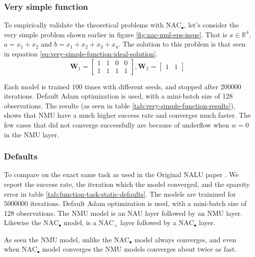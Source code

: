 \subsubsection{Very simple function}

To empirically validate the theoretical problems with $\mathrm{NAC}_{\bullet}$, let's consider the very simple problem shown earlier in figure \ref{fig:nac-mul-eps-issue}. That is $x \in \mathbb{R}^4$, $a = x_1 + x_2$ and $b = x_1 + x_2 + x_3 + x_4$. The solution to this problem is that seen in equation \ref{eq:very-simple-function-ideal-solution}.
\begin{equation}
    \mathbf{W}_1 = \begin{bmatrix}
    1 & 1 & 0 & 0 \\
    1 & 1 & 1 & 1
    \end{bmatrix}, \mathbf{W}_2 = \begin{bmatrix}
    1 & 1
    \end{bmatrix}
    \label{eq:very-simple-function-ideal-solution}
\end{equation}

Each model is trained 100 times with different seeds, and stopped after 200000 iterations. Default Adam optimization is used, with a mini-batch size of 128 observations. The results (as seen in table \ref{tab:very-simple-function-results}), shows that NMU have a much higher success rate and converges much faster. The few cases that did not converge successfully are because of underflow when $w = 0$ in the NMU layer.



\subsubsection{Defaults}

To compare on the exact same task as used in the Original NALU paper \cite{trask-nalu}. We report the success rate, the iteration which the model converged, and the sparsity error in table \ref{tab:function-task-static-defaults}. The models are trainined for 5000000 iterations. Default Adam optimization is used, with a mini-batch size of 128 observations. The NMU model is an NAU layer followed by an NMU layer. Likewise the  $\mathrm{NAC}_{\bullet}$ model, is a $\mathrm{NAC}_{+}$ layer followed by a $\mathrm{NAC}_{\bullet}$ layer.

As seen the NMU model, unlike the $\mathrm{NAC}_{\bullet}$ model always converges, and even when $\mathrm{NAC}_{\bullet}$ model converges the NMU models converges about twice as fast.


